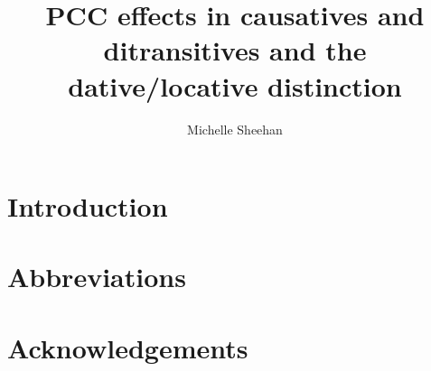 \documentclass[output=paper]{langsci/langscibook}
\author{Michelle Sheehan	\affiliation{}}
\title{PCC effects in causatives and ditransitives and the dative/locative distinction}
\begin{document}
\section{Introduction}  
 
\section*{Abbreviations}
\section*{Acknowledgements}

\sloppy
\printbibliography[heading=subbibliography,notkeyword=this] 
\end{document}
